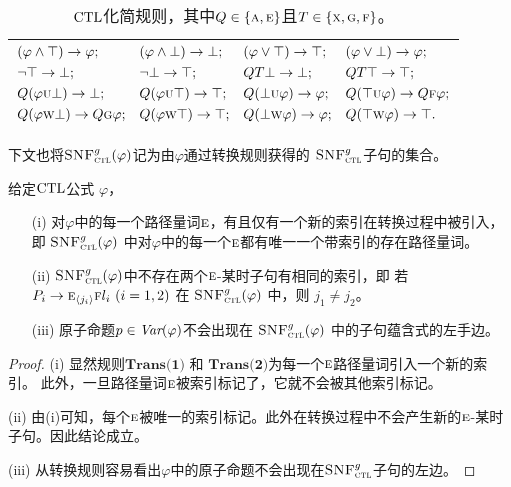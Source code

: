 \begin{table}[h!]%
	\centering\caption{$\textrm{CTL}$化简规则，其中$Q\in \{\textsc{a}, \textsc{e}\}$且$T\in \{\textsc{x},\textsc{g},\textsc{f}\}$。}\label{tab:simp}
	\begin{tabular}{c}
		\toprule
		$
		\begin{aligned}
			& (\varphi \wedge \top) \rightarrow \varphi;
			&&	(\varphi \wedge \bot) \rightarrow \bot;
			&&  (\varphi \vee \top) \rightarrow \top;
			&& (\varphi \vee \bot) \rightarrow \varphi; \\
			&  \neg \top \rightarrow \bot; 
			&& \neg \bot \rightarrow \top; 
			&&  QT \bot \rightarrow \bot; 
			&& QT \top \rightarrow \top;  \\
			& Q(\varphi \textsc{u} \bot) \rightarrow \bot;
			&& Q(\varphi \textsc{u} \top) \rightarrow \top;
			&& Q(\bot \textsc{u} \varphi) \rightarrow \varphi;
			&& Q(\top \textsc{u} \varphi) \rightarrow Q\textsc{f} \varphi;\\
			& Q(\varphi \textsc{w} \bot) \rightarrow Q\textsc{g} \varphi;
			&& Q(\varphi \textsc{w} \top) \rightarrow \top; 
			&& Q(\bot \textsc{w} \varphi) \rightarrow \varphi;
			&& Q(\top \textsc{w} \varphi) \rightarrow \top.
		\end{aligned}
		$\\
		\bottomrule
	\end{tabular}
\end{table}

下文也将${\textsc{SNF}_{\textsc{ctl}}^g}(\varphi)$记为由$\varphi$通过转换规则获得的 ${\textsc{SNF}_{\textsc{ctl}}^g}$子句的集合。


\begin{lemma} \label{lem:ResTransPt}
	给定$\textrm{CTL}$公式 $\varphi$，
	\begin{itemize}
		\item[(i)] 对$\varphi$中的每一个路径量词$\textsc{e}$，有且仅有一个新的索引在转换过程中被引入，即 ${\textsc{SNF}_{\textsc{ctl}}^g}(\varphi)$ 中对$\varphi$中的每一个$\textsc{e}$都有唯一一个带索引的存在路径量词。
		\item[(ii)] ${\textsc{SNF}_{\textsc{ctl}}^g}(\varphi)$中不存在两个$\textsc{e}$-某时子句有相同的索引，即
		若 $P_i\rightarrow \textsc{e}_{{\langle{j_i}\rangle}}\textsc{f} l_i~(i=1,2)$ 在 ${\textsc{SNF}_{\textsc{ctl}}^g}(\varphi)$ 中，则
		$j_1\neq j_2$。
		\item[(iii)] 原子命题$p \in\textit{Var}(\varphi)$不会出现在 ${\textsc{SNF}_{\textsc{ctl}}^g}(\varphi)$ 中的子句蕴含式的左手边。
	\end{itemize}
\end{lemma}
\begin{proof}
	(i) 显然规则$\textbf{Trans(1)}$ 和 $\textbf{Trans(2)}$为每一个$\textsc{e}$路径量词引入一个新的索引。 
	此外，一旦路径量词$\textsc{e}$被索引标记了，它就不会被其他索引标记。
	
	(ii) 由(i)可知，每个$\textsc{e}$被唯一的索引标记。此外在转换过程中不会产生新的$\textsc{e}$-某时子句。因此结论成立。
	
	(iii) 从转换规则容易看出$\varphi$中的原子命题不会出现在${\textsc{SNF}_{\textsc{ctl}}^g}$子句的左边。
\end{proof}

